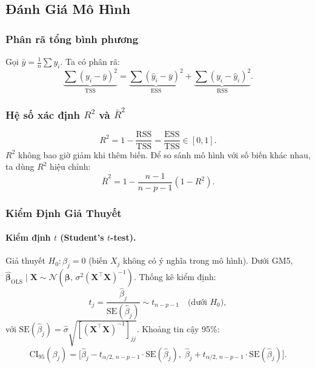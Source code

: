 \subsection{Đánh Giá Mô Hình}

\subsubsection{Phân rã tổng bình phương}

Gọi $\bar{y} = \frac{1}{n}\sum y_i$. Ta có phân rã:
\begin{equation}
    \underbrace{\sum(y_i - \bar{y})^2}_{\mathrm{TSS}}
    = \underbrace{\sum(\hat{y}_i - \bar{y})^2}_{\mathrm{ESS}}
    + \underbrace{\sum(y_i - \hat{y}_i)^2}_{\mathrm{RSS}}.
\end{equation}

\subsubsection{Hệ số xác định $R^2$ và $\bar{R}^2$}

\begin{equation}
    R^2 = 1 - \frac{\mathrm{RSS}}{\mathrm{TSS}} = \frac{\mathrm{ESS}}{\mathrm{TSS}} \in [0,1].
\end{equation}
$R^2$ không bao giờ giảm khi thêm biến. Để so sánh mô hình với số biến khác nhau, ta dùng
$R^2$ hiệu chỉnh:
\begin{equation}
    \bar{R}^2 = 1 - \frac{n-1}{n-p-1}(1 - R^2).
\end{equation}

\subsubsection{Kiểm Định Giả Thuyết}

\paragraph{Kiểm định $t$ (Student's $t$-test).}
Giả thuyết $H_0: \beta_j = 0$ (biến $X_j$ không có ý nghĩa trong mô hình).
Dưới GM5, $\hat{\boldsymbol{\beta}}_{\mathrm{OLS}} \mid \mathbf{X} \sim
\mathcal{N}(\boldsymbol{\beta},\, \sigma^2(\mathbf{X}^\top\mathbf{X})^{-1})$.
Thống kê kiểm định:
\begin{equation}
    t_j = \frac{\hat{\beta}_j}{\mathrm{SE}(\hat{\beta}_j)} \sim t_{n-p-1}
    \quad \text{(dưới } H_0\text{)},
\end{equation}
với $\mathrm{SE}(\hat{\beta}_j) = \hat{\sigma}\sqrt{[(\mathbf{X}^\top\mathbf{X})^{-1}]_{jj}}$.
Khoảng tin cậy 95\%:
\begin{equation}
    \mathrm{CI}_{95}(\beta_j) =
    \bigl[\hat{\beta}_j - t_{\alpha/2,\,n-p-1} \cdot \mathrm{SE}(\hat{\beta}_j),\;
          \hat{\beta}_j + t_{\alpha/2,\,n-p-1} \cdot \mathrm{SE}(\hat{\beta}_j)\bigr].
\end{equation}

